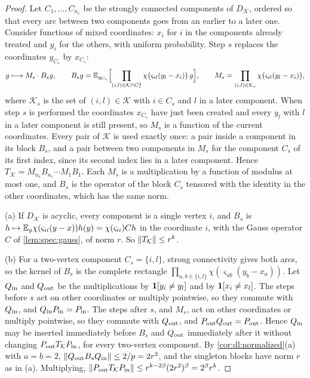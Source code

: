 \begin{proof}
Let $C_1,\dots,C_{n_c}$ be the strongly connected components of $D_{\mathcal K}$,
ordered so that every arc between two components goes from an earlier to a later
one. Consider functions of mixed coordinates: $x_i$ for $i$ in the components
already treated and $y_i$ for the others, with uniform probability. Step $s$
replaces the coordinates $y_{C_s}$ by $x_{C_s}$:
\[
 g\longmapsto M_s\cdot B_sg,\qquad
 B_sg=\mathbb E_{y_{C_s}}\Bigl[\prod_{(i,l)\in\mathcal K\cap C_s^2}
 \chi\bigl(\varsigma_{il}(y_l-x_i)\bigr)\,g\Bigr],\qquad
 M_s=\prod_{(i,l)\in\mathcal K_s}\chi\bigl(\varsigma_{il}(y_l-x_i)\bigr),
\]
where $\mathcal K_s$ is the set of $(i,l)\in\mathcal K$ with $i\in C_s$ and $l$ in a
later component.
When step $s$ is performed the coordinates $x_{C_s}$ have just been created and
every $y_l$ with $l$ in a later component is still present, so $M_s$ is a function
of the current coordinates. Every pair of $\mathcal K$ is used exactly once: a
pair inside a component in its block $B_s$, and a pair between two components in
$M_s$ for the component $C_s$ of its first index, since its second index lies in a
later component. Hence $T_{\mathcal K}=M_{n_c}B_{n_c}\cdots M_1B_1$. Each $M_s$ is a
multiplication by a function of modulus at most one, and $B_s$ is the operator of
the block $C_s$ tensored with the identity in the other coordinates, which has the
same norm.

(a) If $D_{\mathcal K}$ is acyclic, every component is a single vertex $i$, and
$B_s$ is $h\mapsto\mathbb E_y\chi(\varsigma_{ii}(y-x))h(y)=\chi(\varsigma_{ii})Ch$ in the
coordinate $i$, with the Gauss operator $C$ of \cref{lem:spec:gauss}, of norm $r$.
So $\left\|T_{\mathcal K}\right\|\le r^k$.

(b) For a two-vertex component $C_s=\{i,l\}$, strong connectivity gives both arcs,
so the kernel of $B_s$ is the complete rectangle
$\prod_{a,b\in\{i,l\}}\chi(\varsigma_{ab}(y_b-x_a))$. Let $Q_{\rm in}$ and
$Q_{\rm out}$ be the multiplications by $\mathbf 1[y_i\ne y_l]$ and by
$\mathbf 1[x_i\ne x_l]$. The steps before $s$ act on other coordinates or multiply
pointwise, so they commute with $Q_{\rm in}$, and $Q_{\rm in}P_{\rm in}=P_{\rm in}$.
The steps after $s$, and $M_s$, act on other coordinates or multiply pointwise, so
they commute with $Q_{\rm out}$, and $P_{\rm out}Q_{\rm out}=P_{\rm out}$. Hence
$Q_{\rm in}$ may be inserted immediately before $B_s$ and $Q_{\rm out}$ immediately
after it without changing $P_{\rm out}T_{\mathcal K}P_{\rm in}$, for every
two-vertex component. By \cref{cor:dl:normalized}(a) with $a=b=2$,
$\left\|Q_{\rm out}B_sQ_{\rm in}\right\|\le2/p=2r^2$, and the singleton blocks have norm
$r$ as in (a). Multiplying, $\left\|P_{\rm out}T_{\mathcal K}P_{\rm in}\right\|\le
r^{k-2\beta}(2r^2)^\beta=2^\beta r^k$.


\end{proof}
